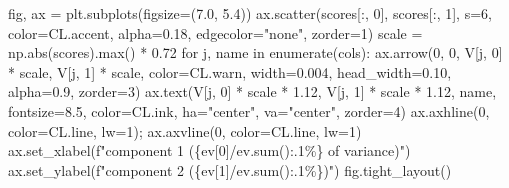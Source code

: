 \documentclass[
  letterpaper,
  10pt,
  twoside,
  openright,
  numbers=noenddot,
  chapterprefix=true]{scrbook}
\newenvironment{Shaded}{}{}
\newcommand{\BuiltInTok}[1]{\textcolor[rgb]{0.84,0.23,0.29}{#1}}
\newcommand{\ControlFlowTok}[1]{\textcolor[rgb]{0.84,0.23,0.29}{#1}}
\newcommand{\DecValTok}[1]{\textcolor[rgb]{0.00,0.36,0.77}{#1}}
\newcommand{\FloatTok}[1]{\textcolor[rgb]{0.00,0.36,0.77}{#1}}
\newcommand{\KeywordTok}[1]{\textcolor[rgb]{0.84,0.23,0.29}{#1}}
\newcommand{\NormalTok}[1]{\textcolor[rgb]{0.14,0.16,0.18}{#1}}
\newcommand{\OperatorTok}[1]{\textcolor[rgb]{0.14,0.16,0.18}{#1}}
\newcommand{\SpecialCharTok}[1]{\textcolor[rgb]{0.00,0.36,0.77}{#1}}
\newcommand{\SpecialStringTok}[1]{\textcolor[rgb]{0.01,0.18,0.38}{#1}}
\newcommand{\StringTok}[1]{\textcolor[rgb]{0.01,0.18,0.38}{#1}}
\begin{document}
\begin{Shaded}
\begin{Highlighting}[]
\NormalTok{fig, ax }\OperatorTok{=}\NormalTok{ plt.subplots(figsize}\OperatorTok{=}\NormalTok{(}\FloatTok{7.0}\NormalTok{, }\FloatTok{5.4}\NormalTok{))}
\NormalTok{ax.scatter(scores[:, }\DecValTok{0}\NormalTok{], scores[:, }\DecValTok{1}\NormalTok{], s}\OperatorTok{=}\DecValTok{6}\NormalTok{, color}\OperatorTok{=}\NormalTok{CL.accent, alpha}\OperatorTok{=}\FloatTok{0.18}\NormalTok{,}
\NormalTok{           edgecolor}\OperatorTok{=}\StringTok{"none"}\NormalTok{, zorder}\OperatorTok{=}\DecValTok{1}\NormalTok{)}
\NormalTok{scale }\OperatorTok{=}\NormalTok{ np.}\BuiltInTok{abs}\NormalTok{(scores).}\BuiltInTok{max}\NormalTok{() }\OperatorTok{*} \FloatTok{0.72}
\ControlFlowTok{for}\NormalTok{ j, name }\KeywordTok{in} \BuiltInTok{enumerate}\NormalTok{(cols):}
\NormalTok{    ax.arrow(}\DecValTok{0}\NormalTok{, }\DecValTok{0}\NormalTok{, V[j, }\DecValTok{0}\NormalTok{] }\OperatorTok{*}\NormalTok{ scale, V[j, }\DecValTok{1}\NormalTok{] }\OperatorTok{*}\NormalTok{ scale, color}\OperatorTok{=}\NormalTok{CL.warn,}
\NormalTok{             width}\OperatorTok{=}\FloatTok{0.004}\NormalTok{, head\_width}\OperatorTok{=}\FloatTok{0.10}\NormalTok{, alpha}\OperatorTok{=}\FloatTok{0.9}\NormalTok{, zorder}\OperatorTok{=}\DecValTok{3}\NormalTok{)}
\NormalTok{    ax.text(V[j, }\DecValTok{0}\NormalTok{] }\OperatorTok{*}\NormalTok{ scale }\OperatorTok{*} \FloatTok{1.12}\NormalTok{, V[j, }\DecValTok{1}\NormalTok{] }\OperatorTok{*}\NormalTok{ scale }\OperatorTok{*} \FloatTok{1.12}\NormalTok{, name,}
\NormalTok{            fontsize}\OperatorTok{=}\FloatTok{8.5}\NormalTok{, color}\OperatorTok{=}\NormalTok{CL.ink, ha}\OperatorTok{=}\StringTok{"center"}\NormalTok{, va}\OperatorTok{=}\StringTok{"center"}\NormalTok{, zorder}\OperatorTok{=}\DecValTok{4}\NormalTok{)}
\NormalTok{ax.axhline(}\DecValTok{0}\NormalTok{, color}\OperatorTok{=}\NormalTok{CL.line, lw}\OperatorTok{=}\DecValTok{1}\NormalTok{)}\OperatorTok{;}\NormalTok{ ax.axvline(}\DecValTok{0}\NormalTok{, color}\OperatorTok{=}\NormalTok{CL.line, lw}\OperatorTok{=}\DecValTok{1}\NormalTok{)}
\NormalTok{ax.set\_xlabel(}\SpecialStringTok{f"component 1 (}\SpecialCharTok{\{}\NormalTok{ev[}\DecValTok{0}\NormalTok{]}\OperatorTok{/}\NormalTok{ev}\SpecialCharTok{.}\BuiltInTok{sum}\NormalTok{()}\SpecialCharTok{:.1\%\}}\SpecialStringTok{ of variance)"}\NormalTok{)}
\NormalTok{ax.set\_ylabel(}\SpecialStringTok{f"component 2 (}\SpecialCharTok{\{}\NormalTok{ev[}\DecValTok{1}\NormalTok{]}\OperatorTok{/}\NormalTok{ev}\SpecialCharTok{.}\BuiltInTok{sum}\NormalTok{()}\SpecialCharTok{:.1\%\}}\SpecialStringTok{)"}\NormalTok{)}
\NormalTok{fig.tight\_layout()}


\end{Highlighting}
\end{Shaded}
\end{document}
